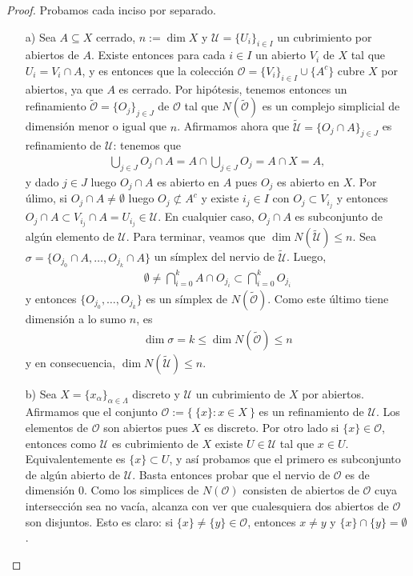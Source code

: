 \documentclass[11pt]{article}
\begin{document}
\begin{proof} Probamos cada inciso por separado.
\begin{itemize}
\item[a)] Sea $A \subseteq X$ cerrado, $n := \dim X$ y $\mathcal{U} = \{U_i\}_{i \in I}$ un cubrimiento por abiertos de $A$. Existe entonces para cada $i \in I$ un abierto $V_i$ de $X$ tal que $U_i = V_i \cap A$, y es entonces que la colecci\'on $\mathcal{O} = \{V_i\}_{i \in I} \cup \{A^c\}$ cubre $X$ por abiertos, ya que $A$ es cerrado. Por hip\'otesis, tenemos entonces un refinamiento $\tilde{\mathcal{O}} = \{O_j\}_{j \in J}$ de $\mathcal{O}$ tal que $N(\tilde{\mathcal{O}})$ es un complejo simplicial de dimensi\'on menor o igual que $n$. Afirmamos ahora que $\tilde{\mathcal{U}} = \{O_j \cap A\}_{j \in J}$ es refinamiento de $\mathcal{U}$: tenemos que
\begin{align*}
\bigcup_{j \in J} O_j \cap A = A \cap \bigcup_{j \in J}O_j = A \cap X = A,
\end{align*}
y dado $j \in J$ luego $O_j \cap A$ es abierto en $A$ pues $O_j$ es abierto en $X$. Por \'ulimo, si $O_j \cap A \neq \emptyset$ luego $O_j \not \subset A^c$ y existe $i_j \in I$ con $O_j \subset V_{i_j}$ y entonces $O_j \cap A \subset V_{i_j} \cap A = U_{i_j} \in \mathcal{U}$. En cualquier caso, $O_j \cap A$ es subconjunto de alg\'un elemento de $\mathcal{U}$. Para terminar, veamos que $\dim N(\tilde{\mathcal{U}}) \leq n$. Sea $\sigma = \{O_{j_0} \cap A, \dots, O_{j_k} \cap A \}$ un s\'implex del nervio de $\tilde{\mathcal{U}}$. Luego, 
\begin{align*}
\emptyset \neq \bigcap_{i=0}^k A \cap O_{j_i} \subset \bigcap_{i=0}^k O_{j_i}
\end{align*}
y entonces $\{O_{j_0}, \dots, O_{j_k}\}$ es un s\'implex de $N(\tilde{\mathcal{O}})$. Como este \'ultimo tiene dimensi\'on a lo sumo $n$, es 
\begin{align*}
\dim \sigma  = k \leq \dim N(\tilde{\mathcal{O}}) \leq n
\end{align*}
y en consecuencia, $\dim N(\tilde{\mathcal{U}}) \leq n$.
\item[b)] Sea $X = \{x_\alpha\}_{\alpha \in \Lambda}$ discreto y $\mathcal{U}$ un cubrimiento de $X$ por abiertos. Afirmamos que el conjunto $\mathcal{O} := \{ \ \{x\} : x \in X \ \}$ es un refinamiento de $\mathcal{U}$. Los elementos de $\mathcal{O}$ son abiertos pues $X$ es discreto. Por otro lado si $\{x\} \in \mathcal{O}$, entonces como $\mathcal{U}$ es cubrimiento de $X$ existe $U \in \mathcal{U}$ tal que $x \in U$. Equivalentemente es $\{x\} \subset U$, y as\'i probamos que el primero es subconjunto de alg\'un abierto de $\mathcal{U}$. Basta entonces probar que el nervio de $\mathcal{O}$ es de dimensi\'on $0$. Como los simplices de $N(\mathcal{O})$ consisten de abiertos de $\mathcal{O}$ cuya intersecci\'on sea no vac\'ia, alcanza con ver que cualesquiera dos abiertos de $\mathcal{O}$ son disjuntos. Esto es claro: si $\{x\} \neq \{y\} \in \mathcal{O}$, entonces $x \neq y$ y $\{x\} \cap \{y\} = \emptyset$. 

\end{itemize}
\end{proof}
\end{document}
